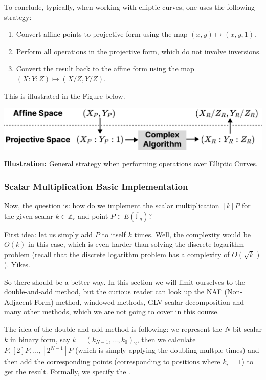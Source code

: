 \documentclass[../lecture-notes.tex]{subfiles}
\begin{document}
\begin{proposition}
    To conclude, typically, when working with elliptic curves, one uses the following strategy:
    \begin{enumerate}
        \item Convert affine points to projective form using the map $(x,y) \mapsto (x,y,1)$.
        \item Perform all operations in the projective form, which do not involve inversions.
        \item Convert the result back to the affine form using the map $(X:Y:Z) \mapsto (X/Z,Y/Z)$.
    \end{enumerate}

    This is illustrated in the Figure below.
    \begin{center}
        \includegraphics[width=0.8\linewidth]{images/lecture_4/strategy.pdf}
        
        \small{\textbf{Illustration:} General strategy when performing operations over Elliptic Curves.}
    \end{center}
\end{proposition}

\subsubsection{Scalar Multiplication Basic Implementation}

Now, the question is: how do we implement the scalar multiplication $[k]P$ for the given scalar $k \in \mathbb{Z}_r$ and point $P \in E(\overline{\mathbb{F}}_q)$? 

First idea: let us simply add $P$ to itself $k$ times. Well, the complexity would be $O(k)$ in this case, which is even harder than solving the discrete logarithm problem (recall that the discrete logarithm problem has a complexity of $O(\sqrt{k})$). Yikes.

So there should be a better way. In this section we will limit ourselves to the double-and-add method, but the curious reader can look up the NAF (Non-Adjacent Form) method, windowed methods, GLV scalar decomposition and many other methods, which we are not going to cover in this course.

The idea of the double-and-add method is following: we represent the $N$-bit scalar $k$ in binary form, say $k = (k_{N-1},\dots,k_0)_2$, then we calculate $P, [2]P, \dots, [2^{N-1}]P$ (which is simply applying the doubling multple times) and then add the corresponding points (corresponding to positions where $k_i=1$) to get the result. Formally, we specify the .
\end{document}
